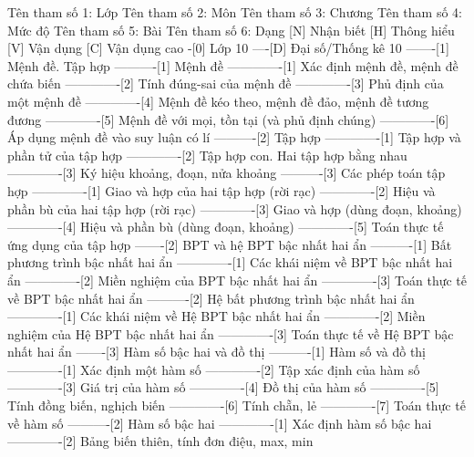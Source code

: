 %
%
%
%
%
Tên tham số 1: Lớp
Tên tham số 2: Môn
Tên tham số 3: Chương
Tên tham số 4: Mức độ
Tên tham số 5: Bài
Tên tham số 6: Dạng
%
%
[N] Nhận biết
[H] Thông hiểu
[V] Vận dụng
[C] Vận dụng cao
%
%
-[0] Lớp 10
----[D] Đại số/Thống kê 10
-------[1] Mệnh đề. Tập hợp
----------[1] Mệnh đề
-------------[1] Xác định mệnh đề, mệnh đề chứa biến
-------------[2] Tính đúng-sai của mệnh đề
-------------[3] Phủ định của một mệnh đề
-------------[4] Mệnh đề kéo theo, mệnh đề đảo, mệnh đề tương đương
-------------[5] Mệnh đề với mọi, tồn tại (và phủ định chúng)
-------------[6] Áp dụng mệnh đề vào suy luận có lí
----------[2] Tập hợp
-------------[1] Tập hợp và phần tử của tập hợp
-------------[2] Tập hợp con. Hai tập hợp bằng nhau
-------------[3] Ký hiệu khoảng, đoạn, nửa khoảng
----------[3] Các phép toán tập hợp
-------------[1] Giao và hợp của hai tập hợp (rời rạc)
-------------[2] Hiệu và phần bù của hai tập hợp (rời rạc)
-------------[3] Giao và hợp (dùng đoạn, khoảng)
-------------[4] Hiệu và phần bù (dùng đoạn, khoảng)
-------------[5] Toán thực tế ứng dụng của tập hợp
-------[2] BPT và hệ BPT bậc nhất hai ẩn
----------[1] Bất phương trình bậc nhất hai ẩn
-------------[1] Các khái niệm về BPT bậc nhất hai ẩn
-------------[2] Miền nghiệm của BPT bậc nhất hai ẩn
-------------[3] Toán thực tế về BPT bậc nhất hai ẩn
----------[2] Hệ bất phương trình bậc nhất hai ẩn
-------------[1] Các khái niệm về Hệ BPT bậc nhất hai ẩn
-------------[2] Miền nghiệm của Hệ BPT bậc nhất hai ẩn
-------------[3] Toán thực tế về Hệ BPT bậc nhất hai ẩn
-------[3] Hàm số bậc hai và đồ thị
----------[1] Hàm số và đồ thị
-------------[1] Xác định một hàm số
-------------[2] Tập xác định của hàm số
-------------[3] Giá trị của hàm số
-------------[4] Đồ thị của hàm số
-------------[5] Tính đồng biến, nghịch biến
-------------[6] Tính chẵn, lẻ
-------------[7] Toán thực tế về hàm số
----------[2] Hàm số bậc hai
-------------[1] Xác định hàm số bậc hai
-------------[2] Bảng biến thiên, tính đơn điệu, max, min
